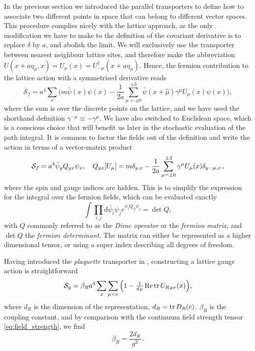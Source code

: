 In the previous section we introduced the parallel transporters to define how to
associate two different points in space that can belong to different vector
spaces. This procedure complies nicely with the lattice approach, as the only modification we
have to make to the definition of the covariant derivative is to
replace $\delta$ by $a$, and abolish the limit. We will exclusively use the
transporter between nearest neighbour lattice sites, and therefore make the
abbreviation $U(x + a \eta_\mu, x) = U_{\mu}(x) =
U_{-\mu}^{\dagger}(x+a\eta_{\mu})$. Hence, the fermion contribution to the
lattice action with a symmetrised derivative reads
%
\begin{equation} \label{eq:naive_fermions}
  \mathcal{S}_f = a^4 \sum_x \Big( 
    m \bar{\psi}(x)\psi(x) - 
    \frac{1}{2a}\sum_{\mu=\pm 0}^{\pm 3}
    \bar{\psi}(x+\hat{\mu})\gamma^{\mu}U_{\mu}(x) \psi(x) \bigg),
\end{equation}
%
where the sum is over the discrete points on the lattice, and we have used the
shorthand definition $\gamma^{-\mu} \equiv -\gamma^{\mu}$. We have also switched
to Euclidean space, which is a conscious choice that will benefit us later in
the stochastic evaluation of the path integral. It is common to factor the
fields out of the definition and write the action in terms of a vector-matrix
product
%
\begin{equation}
  \mathcal{S}_f = a^4 \bar{\psi}_y Q_{yx} \psi_x, \hskip1em 
  Q_{yx}[U_{\mu}] = m \delta_{y,x} - \frac{1}{2a} \sum_{\mu=\pm 0}^{\pm 3} \gamma^{\mu}
    U_{\mu}(x) \delta_{y-\mu,x} \,,
\end{equation}
%
where the spin and gauge indices are hidden.  This is to simplify the expression
for the integral over the fermion fields, which can be evaluated exactly
%
\begin{equation} \label{eq:fermion-integral}
  \int \prod_{i,j} \mathrm{d} \bar{\psi}_i \psi_j e^{\bar{\psi}_i Q_{ij} \psi_j}
   = \det Q,
\end{equation}
%
with $Q$ commonly referred to as the \emph{Dirac operator} or the \emph{fermion
  matrix}, and $\det Q$ the \emph{fermion determinant}. The matrix can either be
represented as a higher dimensional tensor, or using a super index describing all
degrees of freedom.

Having introduced the \emph{plaquette} transporter in
, constructing a lattice gauge action is
straightforward
%
\begin{equation}
  \mathcal{S}_g = \beta_R a^4 \sum_x \sum_{\mu < \nu} \Big( 1 -
    \textstyle\frac{1}{d_R} \hskip.2ex \text{Re} \operatorname{tr} U_{R \hskip.2ex\mu\nu}(x) \Big),
\end{equation}
%
where $d_R$ is the dimension of the representation, $d_R = \operatorname{tr} D_R(e)$. $\beta_R$ is the
coupling constant, and by comparison with the continuum field strength tensor
\eqref{eq:field_strength}, we find
%
\begin{equation}
  \beta_R = \frac{2 d_R}{g^2} \,.
\end{equation}

